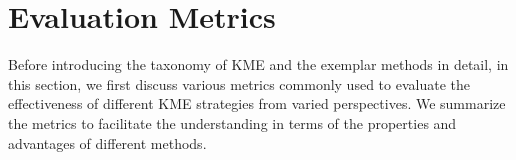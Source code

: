 \documentclass[acmsmall, screen]{acmart}
\begin{document}









\section{Evaluation Metrics}\label{sec:metric}

Before introducing the taxonomy of KME and the exemplar methods in detail, in this section, we first discuss various metrics commonly used to evaluate the effectiveness of different KME strategies from varied perspectives. We summarize the metrics to facilitate the understanding in terms of the properties and advantages of different methods.


\end{document}
